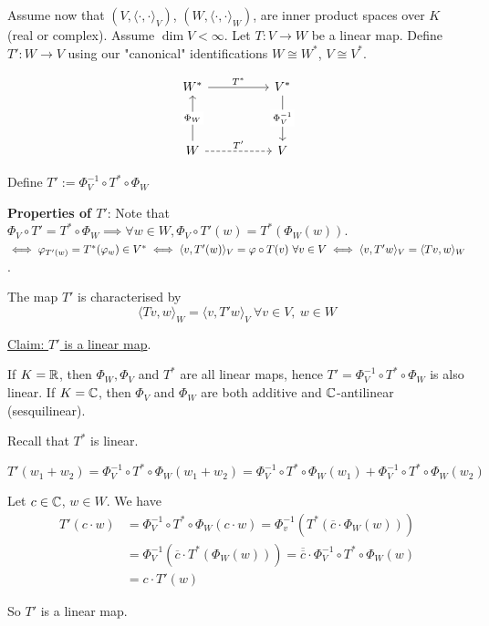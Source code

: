 \documentclass[12pt]{article}
\begin{document}
Assume now that $(V, \langle \cdot, \cdot \rangle_V)$, $(W, \langle \cdot, \cdot \rangle_W)$, are inner product spaces over $K$ (real or complex). Assume $\dim V < \infty$. Let $T: V \rightarrow W$ be a linear map. Define $T': W \rightarrow V$ using our "canonical" identifications $W \cong W^*$, $V \cong V^*$.

\[\begin{tikzcd}
	{W^*} && {V^*} \\
	\\
	W && V
	\arrow["{T^*}", from=1-1, to=1-3]
	\arrow["{\Phi_V^{-1}}"{description}, from=1-3, to=3-3]
	\arrow["{\Phi_W}"{description}, from=3-1, to=1-1]
	\arrow["{T'}", dashed, from=3-1, to=3-3]
\end{tikzcd}\]

Define $T' := \Phi_V^{-1} \circ T^* \circ \Phi_W$

\textbf{Properties of $T'$}: Note that $\Phi_V \circ T' = T^* \circ \Phi_W \implies \forall w \in W, \Phi_V \circ T'(w) = T^*(\Phi_W(w))$. $\iff \varphi_{T'(w)} = T^*(\varphi_w) \in V^* \iff \langle v, T'(w) \rangle_V = \varphi \circ T(v) \ \forall v \in V \iff \langle v, T'w \rangle_V = \langle T v, w \rangle_W$.

The map $T'$ is characterised by
$$
    \langle T v, w \rangle_W = \langle v, T'w \rangle_V \ \forall v \in V,\ w \in W
$$

\underline{Claim: $T'$ is a linear map}.

\begin{proofbox}[of claim]
    If $K = \mathbb{R}$, then $\Phi_W, \Phi_V$ and $T^*$ are all linear maps, hence $T' = \Phi_V^{-1} \circ T^* \circ \Phi_W$ is also linear. If $K = \mathbb{C}$, then $\Phi_V$ and $\Phi_W$ are both additive and $\mathbb{C}$-antilinear (sesquilinear).

    Recall that $T^*$ is linear. 

    \[
        T'(w_1 + w_2) = \Phi_V^{-1} \circ T^* \circ \Phi_W (w_1 + w_2) = \Phi_V^{-1} \circ T^* \circ \Phi_W(w_1) + \Phi_V^{-1} \circ T^* \circ \Phi_W(w_2)
    \]

    Let $c \in \mathbb{C}$, $w \in W$. We have
    \[
    \begin{aligned}
        T'(c \cdot w) &= \Phi_V^{-1} \circ T^* \circ \Phi_W (c \cdot w) = \Phi_v^{-1}\left( T^* (\overline{c} \cdot \Phi_W(w)) \right) \\
        & = \Phi_V^{-1}\left( \overline{c} \cdot T^* (\Phi_W(w)) \right) = \overline{\overline{c}} \cdot \Phi_V^{-1} \circ T^* \circ \Phi_W(w) \\
        &= c \cdot T'(w)
    \end{aligned}
    \]

    So $T'$ is a linear map.
\end{proofbox}
\end{document}
